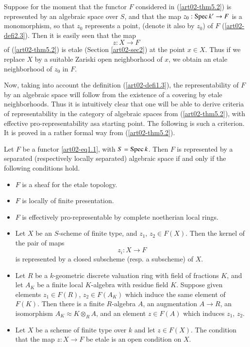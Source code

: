 Suppose for the moment that the functor $F$ considered in (\ref{art02-thm5.2}) is represented by an algebraic space over $S$, and that the map $z_{0}:\operatorname{\mathrm{Spec}} k'\to F$ is a monomorphism, so that $z_{0}$ represents a point, (denote it also by $z_{0}$) of $F$ (\ref{art02-defi2.3}). Then it is easily seen that the map
$$
z:X\to F
$$
of (\ref{art02-thm5.2}) is etale (Section \ref{art02-sec2}) at the point $x\in X$. Thus if we replace $X$ by a suitable Zariski open neighborhood of $x$, we obtain an etale neighborhood of $z_{0}$ in $F$.

Now, taking into account the definition (\ref{art02-defi1.3}), the representability of $F$ by an algebraic space will follow from the existence of a covering by etale neighborhoods. Thus it is intuitively clear that one will be able to derive criteria of representability in the category of algebraic spaces from (\ref{art02-thm5.2}), with effective pro-representability as\pageoriginale a starting point. The following is such a criterion. It is proved in a rather formal way from (\ref{art02-thm5.2}).

\begin{theorem}\label{art02-thm5.6}
Let $F$ be a functor \eqref{art02-eq1.1}, with $S=\operatorname{\mathrm{Spec}} k$. Then $F$ is represented by a separated (respectively locally separated) algebraic space if and only if the following conditions hold.
\begin{itemize}
\item[{\rm[0]}] $F$ is a sheaf for the etale topology.

\item[{\rm[1]}] $F$ is locally of finite presentation.

\item[{\rm[2]}] $F$ is effectively pro-representable by complete noetherian local rings.

\item[{\rm[3]}] Let $X$ be an $S$-scheme of finite type, and $z_{1}$, $z_{2}\in F(X)$. Then the kernel of the pair of maps
$$
z_{i}:X\to F
$$
is represented by a closed subscheme (resp. a subscheme) of $X$.

\item[{\rm[4]}] Let $R$ be a $k$-geometric discrete valuation ring with field of fractions $K$, and let $A_{K}$ be a finite local $K$-algebra with residue field $K$. Suppose given elements $z_{1}\in F(R)$, $z_{2}\in F(A_{K})$ which induce the same element of $F(K)$. Then there is a finite $R$-algebra $A$, an augmentation $A\to R$, an isomorphism $A_{K}\approx K\otimes_{R}A$, and an element $z\in F(A)$ which induces $z_{1}$, $z_{2}$.

\item[{\rm[5]}] Let $X$ be a scheme of finite type over $k$ and let $z\in F(X)$. The condition that the map $z:X\to F$ be etale is an open condition on $X$.
\end{itemize}
\end{theorem}

